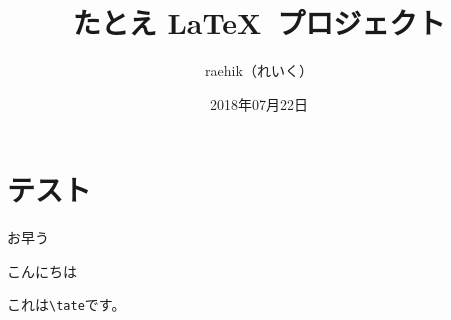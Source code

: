 \newcommand{\addcfg}[1]{}
\newcommand{\addsrc}[1]{}

\addcfg{preamble}

\usepackage{luatexja-fontspec}


\title{たとえ \LaTeX\ プロジェクト}
\author{raehik（れいく）}
\date{2018年07月22日}



\maketitle

\clearpage
\tableofcontents
\clearpage

\section{テスト}
お早う

こんにちは


\begin{minipage}{\textwidth}
\end{minipage}

\tate これは\verb|\tate|です。


